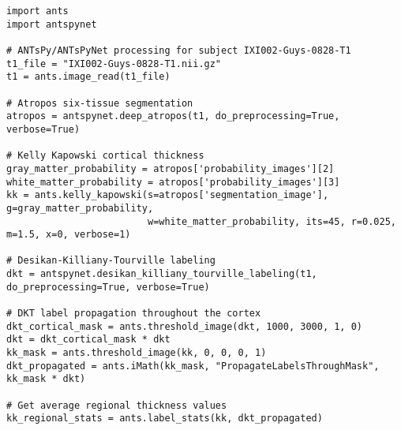


\begin{lstlisting}
import ants
import antspynet

# ANTsPy/ANTsPyNet processing for subject IXI002-Guys-0828-T1
t1_file = "IXI002-Guys-0828-T1.nii.gz"
t1 = ants.image_read(t1_file)

# Atropos six-tissue segmentation
atropos = antspynet.deep_atropos(t1, do_preprocessing=True, verbose=True)

# Kelly Kapowski cortical thickness
gray_matter_probability = atropos['probability_images'][2]
white_matter_probability = atropos['probability_images'][3]
kk = ants.kelly_kapowski(s=atropos['segmentation_image'], g=gray_matter_probability,
                         w=white_matter_probability, its=45, r=0.025, m=1.5, x=0, verbose=1)

# Desikan-Killiany-Tourville labeling
dkt = antspynet.desikan_killiany_tourville_labeling(t1, do_preprocessing=True, verbose=True)

# DKT label propagation throughout the cortex
dkt_cortical_mask = ants.threshold_image(dkt, 1000, 3000, 1, 0)
dkt = dkt_cortical_mask * dkt
kk_mask = ants.threshold_image(kk, 0, 0, 0, 1)
dkt_propagated = ants.iMath(kk_mask, "PropagateLabelsThroughMask", kk_mask * dkt)

# Get average regional thickness values
kk_regional_stats = ants.label_stats(kk, dkt_propagated)
\end{lstlisting}



